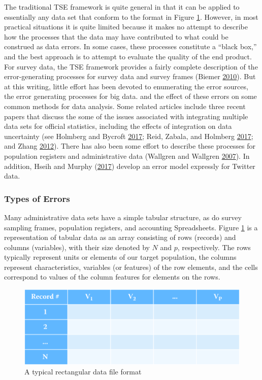 \documentclass[]{krantz}
\begin{document}
The traditional TSE framework is quite general in that it can be applied
to essentially any data set that conform to the format in Figure
\ref{fig:fig10-1}. However, in most practical situations it is quite
limited because it makes no attempt to describe how the processes that
the data may have contributed to what could be construed as data errors.
In some cases, these processes constitute a ``black box,'' and the best
approach is to attempt to evaluate the quality of the end product. For
survey data, the TSE framework provides a fairly complete description of
the error-generating processes for survey data and survey frames (Biemer
\protect\hyperlink{ref-biemer2010total}{2010}). But at this writing,
little effort has been devoted to enumerating the error sources, the
error generating processes for big data. and the effect of these errors
on some common methods for data analysis. Some related articles include
three recent papers that discuss the some of the issues associated with
integrating multiple data sets for official statistics, including the
effects of integration on data uncertainty (see Holmberg and Bycroft
\protect\hyperlink{ref-Holmberg2017}{2017}; Reid, Zabala, and Holmberg
\protect\hyperlink{ref-Reid2017}{2017}; and Zhang
\protect\hyperlink{ref-Zhang2012}{2012}). There has also been some
effort to describe these processes for population registers and
administrative data (Wallgren and Wallgren
\protect\hyperlink{ref-wallgren2007register}{2007}). In addition, Hseih
and Murphy (\protect\hyperlink{ref-Hsieh2017}{2017}) develop an error
model expressly for Twitter data.

\subsubsection{Types of Errors}\label{types-of-errors}

Many administrative data sets have a simple tabular structure, as do
survey sampling frames, population registers, and accounting
Spreadsheets. Figure \ref{fig:fig10-1} is a representation of tabular
data as an array consisting of rows (records) and columns (variables),
with their size denoted by \(N\) and \(p\), respectively. The rows
typically represent units or elements of our target population, the
columns represent characteristics, variables (or features) of the row
elements, and the cells correspond to values of the column features for
elements on the rows.

\begin{figure}

{\centering \includegraphics[width=0.7\linewidth]{ChapterError/figures/fig10-1} 

}

\caption{A typical rectangular data file format}\label{fig:fig10-1}
\end{figure}
\end{document}
